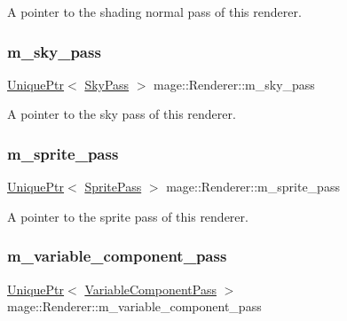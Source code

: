 A pointer to the shading normal pass of this renderer. \hypertarget{classmage_1_1_renderer_a7e9d76a3294d0a5b2d99a5335ff0cd04}{}\label{classmage_1_1_renderer_a7e9d76a3294d0a5b2d99a5335ff0cd04} 
\subsubsection{\texorpdfstring{m\+\_\+sky\+\_\+pass}{m\_sky\_pass}}
{\footnotesize\ttfamily \hyperlink{namespacemage_a3316d7143a973e37adf1110f2e80ca31}{Unique\+Ptr}$<$ \hyperlink{classmage_1_1_sky_pass}{Sky\+Pass} $>$ mage\+::\+Renderer\+::m\+\_\+sky\+\_\+pass\hspace{0.3cm}{\ttfamily [private]}}

A pointer to the sky pass of this renderer. \hypertarget{classmage_1_1_renderer_ae6850abe92b8d03f3eefbfb34fe9e5d8}{}\label{classmage_1_1_renderer_ae6850abe92b8d03f3eefbfb34fe9e5d8} 
\subsubsection{\texorpdfstring{m\+\_\+sprite\+\_\+pass}{m\_sprite\_pass}}
{\footnotesize\ttfamily \hyperlink{namespacemage_a3316d7143a973e37adf1110f2e80ca31}{Unique\+Ptr}$<$ \hyperlink{classmage_1_1_sprite_pass}{Sprite\+Pass} $>$ mage\+::\+Renderer\+::m\+\_\+sprite\+\_\+pass\hspace{0.3cm}{\ttfamily [private]}}

A pointer to the sprite pass of this renderer. \hypertarget{classmage_1_1_renderer_a6016e73941650d3b88ef9ab9873548a6}{}\label{classmage_1_1_renderer_a6016e73941650d3b88ef9ab9873548a6} 
\subsubsection{\texorpdfstring{m\+\_\+variable\+\_\+component\+\_\+pass}{m\_variable\_component\_pass}}
{\footnotesize\ttfamily \hyperlink{namespacemage_a3316d7143a973e37adf1110f2e80ca31}{Unique\+Ptr}$<$ \hyperlink{classmage_1_1_variable_component_pass}{Variable\+Component\+Pass} $>$ mage\+::\+Renderer\+::m\+\_\+variable\+\_\+component\+\_\+pass\hspace{0.3cm}{\ttfamily [private]}}

